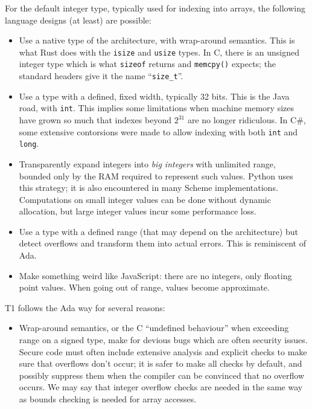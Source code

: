 \begin{rationale}
For the default integer type, typically used for indexing into arrays,
the following language designs (at least) are possible:
\begin{itemize}

    \item Use a native type of the architecture, with wrap-around
    semantics. This is what Rust does with the \verb|isize| and
    \verb|usize| types. In C, there is an unsigned integer type which
    is what \verb|sizeof| returns and \verb|memcpy()| expects; the
    standard headers give it the name ``\verb|size_t|''.

    \item Use a type with a defined, fixed width, typically 32 bits.
    This is the Java road, with \verb|int|. This implies some
    limitations when machine memory sizes have grown so much that
    indexes beyond $2^{31}$ are no longer ridiculous. In C\#, some
    extensive contorsions were made to allow indexing with both
    \verb|int| and \verb|long|.

    \item Transparently expand integers into \emph{big integers} with
    unlimited range, bounded only by the RAM required to represent such
    values. Python uses this strategy; it is also encountered in many
    Scheme implementations. Computations on small integer values can
    be done without dynamic allocation, but large integer values incur
    some performance loss.

    \item Use a type with a defined range (that may depend on the
    architecture) but detect overflows and transform them into actual
    errors. This is reminiscent of Ada.

    \item Make something weird like JavaScript: there are no integers,
    only floating point values. When going out of range, values become
    approximate.

\end{itemize}

T1 follows the Ada way for several reasons:
\begin{itemize}

    \item Wrap-around semantics, or the C ``undefined behaviour'' when
    exceeding range on a signed type, make for devious bugs which are
    often security issues. Secure code must often include extensive
    analysis and explicit checks to make sure that overflows don't occur;
    it is safer to make all checks by default, and possibly suppress
    them when the compiler can be convinced that no overflow occurs. We
    may say that integer overflow checks are needed in the same way as
    bounds checking is needed for array accesses.


\end{itemize}
\end{rationale}
